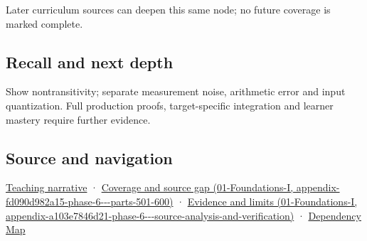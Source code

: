 Later curriculum sources can deepen this same node; no future coverage is marked complete.

\subsection{Recall and next depth}\label{appendix-b5b83329215b-recall-and-next-depth}

Show nontransitivity; separate measurement noise, arithmetic error and input quantization. Full production proofs, target-specific integration and learner mastery require further evidence.

\subsection{Source and navigation}\label{appendix-b5b83329215b-source-and-navigation}

\hyperref[02-foundations-ii-ch037-reliability-begins-at-the-boundary-of-the-calculation]{Teaching narrative} · \href{../01-Foundations-I/main.pdf\#nameddest=appendix-fd090d982a15-phase-6---parts-501-600}{Coverage and source gap (01-Foundations-I, appendix-fd090d982a15-phase-6-\/-\/-parts-501-600)} · \href{../01-Foundations-I/main.pdf\#nameddest=appendix-a103e7846d21-phase-6---source-analysis-and-verification}{Evidence and limits (01-Foundations-I, appendix-a103e7846d21-phase-6-\/-\/-source-analysis-and-verification)} · \hyperref[appendix-4ad47bdd269a]{Dependency Map}
